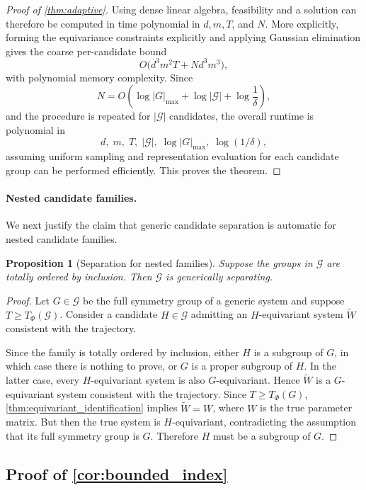\documentclass[11pt]{article}
\theoremstyle{plain}
\newtheorem{proposition}[theorem]{Proposition}
\theoremstyle{definition}
\theoremstyle{remark}
\begin{document}
\begin{proof}[Proof of \cref{thm:adaptive}]
Using dense linear algebra, feasibility and a solution can therefore be
computed in time polynomial in \(d,m,T\), and \(N\). More explicitly, forming
the equivariance constraints explicitly and applying Gaussian elimination
gives the coarse per-candidate bound
\[
O\bigl(d^3m^2T+Nd^3m^3\bigr),
\]
with polynomial memory complexity. Since
\[
N
=
O\left(
\log|G|_{\max}
+
\log|\mathcal G|
+
\log\frac1\delta
\right),
\]
and the procedure is repeated for \(|\mathcal G|\) candidates, the overall
runtime is polynomial in
\[
d,\;m,\;T,\;|\mathcal G|,\;
\log|G|_{\max},\;\log(1/\delta),
\]
assuming uniform sampling and representation evaluation for each candidate
group can be performed efficiently. This proves the theorem.
\end{proof}


\paragraph{Nested candidate families.}
We next justify the claim that generic candidate separation is automatic for
nested candidate families.

\begin{proposition}[Separation for nested families]
\label{prop:nested_separation}
Suppose the groups in \(\mathcal G\) are totally ordered by inclusion. Then
\(\mathcal G\) is generically separating.
\end{proposition}

\begin{proof}
Let \(G\in\mathcal G\) be the full symmetry group of a generic system and
suppose \(T\ge T_\Phi(\mathcal G)\). Consider a candidate
\(H\in\mathcal G\) admitting an \(H\)-equivariant system
\(\widetilde W\) consistent with the trajectory.

Since the family is totally ordered by inclusion, either \(H\) is a subgroup
of \(G\), in which case there is nothing to prove, or \(G\) is a proper
subgroup of \(H\). In the latter case, every \(H\)-equivariant system is also
\(G\)-equivariant. Hence \(\widetilde W\) is a \(G\)-equivariant system
consistent with the trajectory. Since
\(T\ge T_\Phi(G)\), \cref{thm:equivariant_identification} implies
\(\widetilde W=W\), where \(W\) is the true parameter matrix. But then the
true system is \(H\)-equivariant, contradicting the assumption that its full
symmetry group is \(G\). Therefore \(H\) must be a subgroup of \(G\).
\end{proof}

 
\subsection{Proof of \cref{cor:bounded_index}}
\label{app:bounded_index}
\end{document}
